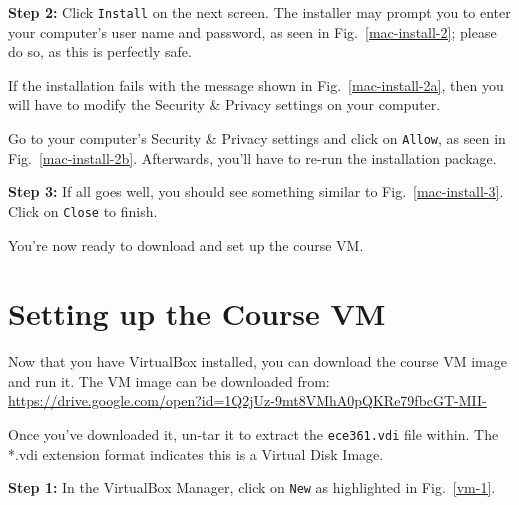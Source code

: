 \documentclass[11pt]{article}
\begin{document}
\textbf{Step 2:} Click \texttt{Install} on the next screen. The installer may prompt you to enter your computer's user name and password, as seen in Fig.~\ref{mac-install-2}; please do so, as this is perfectly safe.

If the installation fails with the message shown in Fig.~\ref{mac-install-2a}, then you will have to modify the Security \& Privacy settings on your computer.

Go to your computer's Security \& Privacy settings and click on \texttt{Allow}, as seen in Fig.~\ref{mac-install-2b}. Afterwards, you'll have to re-run the installation package.

\textbf{Step 3:} If all goes well, you should see something similar to Fig.~\ref{mac-install-3}. Click on \texttt{Close} to finish.

You're now ready to download and set up the course VM.


\section{Setting up the Course VM}
\label{sec:setup-vm}
Now that you have VirtualBox installed, you can download the course VM image and run it. The VM image can be downloaded from:\\
\url{https://drive.google.com/open?id=1Q2jUz-9mt8VMhA0pQKRe79fbcGT-MII-}

\noindent Once you've downloaded it, un-tar it to extract the \texttt{ece361.vdi} file within. The *.vdi extension format indicates this is a Virtual Disk Image.

\textbf{Step 1:} In the VirtualBox Manager, click on \texttt{New} as highlighted in Fig.~\ref{vm-1}.
\end{document}
